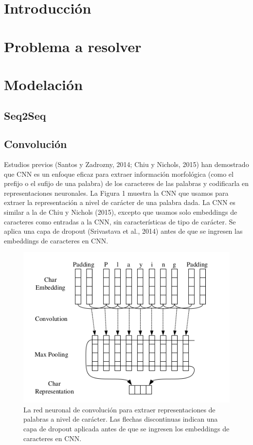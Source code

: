 \documentclass[runningheads]{llncs}
\begin{document}
\section{Introducción}

\section{Problema a resolver}

\section{Modelación}

\subsection{Seq2Seq}

\subsection{Convolución}
Estudios previos (Santos y Zadrozny, 2014; Chiu y Nichols, 2015) han demostrado que CNN es un enfoque eficaz para extraer información morfológica (como el prefijo o el sufijo de una palabra) de los caracteres de las palabras y codificarla en representaciones neuronales. La Figura 1 muestra la CNN que usamos para extraer la representación a nivel de carácter de una palabra dada. La CNN es similar a la de Chiu y Nichols (2015), excepto que usamos solo embeddings de caracteres como entradas a la CNN, sin características de tipo de carácter. Se aplica una capa de dropout (Srivastava et al., 2014) antes de que se ingresen las embeddings de caracteres en CNN.


\begin{figure}
	\centering
	\includegraphics[width=12cm]{Fig_1.png}
	\caption{ La red neuronal de convolución para extraer representaciones de palabras a nivel de carácter. Las flechas discontinuas indican una capa de dropout aplicada antes de que se ingresen los embeddings de caracteres en CNN.}
	\label{A1}
\end{figure}
\end{document}
